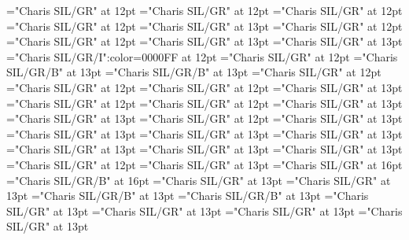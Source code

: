 \documentclass[a4paper]{article}
\begin{document}
\pagestyle{plain}
\sloppy
\setlength{\parfillskip}{0pt plus 1fil}
\font\xitemhi="Charis SIL/GR" at 12pt
\font\xitemte="Charis SIL/GR" at 12pt
\font\xitemxitemCmPossibilitypublishStemTransTypeAbbreviationPubbefore="Charis SIL/GR" at 12pt
\font\xitemxitemcomplexformrefsbefore="Charis SIL/GR" at 12pt
\font\xitemxitemdefinitionbefore="Charis SIL/GR" at 13pt
\font\xitemxitemdefinitionLcbefore="Charis SIL/GR" at 12pt
\font\xitemxitemdefinitionLdbefore="Charis SIL/GR" at 12pt
\font\xitemxitementryrefcomponentbefore="Charis SIL/GR" at 13pt
\font\xitemxitementryreftypebefore="Charis SIL/GR" at 13pt
\font\xitemxitemexamplebefore="Charis SIL/GR/I":color=0000FF at 12pt
\font\xitemxitemexamplesbefore="Charis SIL/GR" at 12pt
\font\xitemxitemheadwordbefore="Charis SIL/GR/B" at 13pt
\font\xitemxitemLexEntrypublishStemComponentTargetHeadWordRefbefore="Charis SIL/GR/B" at 13pt
\font\xitemxitemLexSensepublishStemDefinitionPubbefore="Charis SIL/GR" at 12pt
\font\xitemxitemLexSensepublishStemDefinitionPubLdbefore="Charis SIL/GR" at 12pt
\font\xitemxitemprimaryrefsbefore="Charis SIL/GR" at 12pt
\font\xitemxitempronunciationbefore="Charis SIL/GR" at 13pt
\font\xitemxitempronunciationsbefore="Charis SIL/GR" at 12pt
\font\xitemxitemsemanticdomainsbefore="Charis SIL/GR" at 12pt
\font\sensesensesensesbefore="Charis SIL/GR" at 13pt
\font\xitemxitemtranslationbefore="Charis SIL/GR" at 13pt
\font\xitemxitemtranslationLdbefore="Charis SIL/GR" at 12pt
\font\xitemxitemcrossrefbefore="Charis SIL/GR" at 13pt
\font\xitemxitemcrossreftargetsbefore="Charis SIL/GR" at 13pt
\font\xitemxitemcrossreftypebefore="Charis SIL/GR" at 13pt
\font\xitemxitemheadwordminorbefore="Charis SIL/GR" at 13pt
\font\xitemxitemmainentryrefbefore="Charis SIL/GR" at 13pt
\font\xitemxitemmainentryrefminorbefore="Charis SIL/GR" at 13pt
\font\xitemxitempronunciationminorbefore="Charis SIL/GR" at 13pt
\font\xitemxitemsensecrossrefbefore="Charis SIL/GR" at 12pt
\font\xitemxitemsensemainentryrefbefore="Charis SIL/GR" at 13pt
\font{}="Charis SIL/GR" at 16pt
\font{}="Charis SIL/GR/B" at 16pt
\font{}="Charis SIL/GR" at 13pt
\font\entryletDatadicBody="Charis SIL/GR" at 13pt
\font\headwordggoTeluINentryletDatadicBody="Charis SIL/GR/B" at 13pt
\font\spanenheadwordggoTeluINentryletDatadicBody="Charis SIL/GR/B" at 13pt
\font\pronunciationsentryletDatadicBody="Charis SIL/GR" at 13pt
\font\pronunciationggofonipaxemicpronunciationsentryletDatadicBody="Charis SIL/GR" at 13pt
\font\spanenpronunciationggofonipaxemicpronunciationsentryletDatadicBody="Charis SIL/GR" at 13pt
\font\spanggofonipaxemicpronunciationggofonipaxemicpronunciationsentryletDatadicBody="Charis SIL/GR" at 13pt
\end{document}
